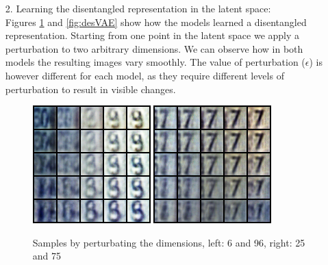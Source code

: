 \begin{itemize}
\begin{enumerate}
\item[2.]{Learning the disentangled representation in the latent space:}\\
Figures \ref{fig:des1} and \ref{fig:desVAE} show how the models learned a disentangled representation. Starting from one point in the latent space we apply a perturbation to two arbitrary dimensions. We can observe how in both models the resulting images vary smoothly. The value of perturbation ($\epsilon$) is however different for each model, as they require different levels of perturbation to result in visible changes.
\begin{figure}[H]
	\centering
	\includegraphics[scale=1]{gandesent1.png}
	\quad
	\includegraphics[scale=1]{gandesent2.png}
	\caption{Samples by perturbating the dimensions, left: 6 and 96, right: 25 and 75}
	\label{fig:des1}
\end{figure}



\end{enumerate}
\end{itemize}
